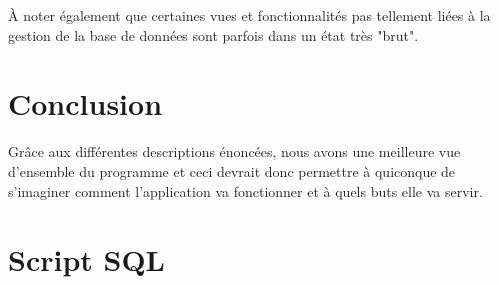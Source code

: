 \documentclass[a4paper,11pt]{article}
\begin{document}
À noter également que certaines vues et fonctionnalités pas tellement liées à la gestion de la base de données sont parfois dans un état très "brut".


\section*{Conclusion}
Grâce aux différentes descriptions énoncées, nous avons une meilleure vue d'ensemble du programme et ceci devrait donc permettre à quiconque de s'imaginer comment l'application va fonctionner et à quels buts elle va servir.

\newpage
\appendix

\section{Script SQL}\label{sql}
\end{document}
